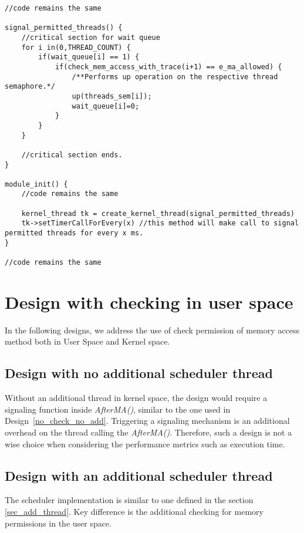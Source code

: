 \begin{lstlisting}[title=Kernel Space - General module definitions, style=customc]
//code remains the same

signal_permitted_threads() {
	//critical section for wait queue
	for i in(0,THREAD_COUNT) {
		if(wait_queue[i] == 1) {
			if(check_mem_access_with_trace(i+1) == e_ma_allowed) {
				/**Performs up operation on the respective thread semaphore.*/
				up(threads_sem[i]);
				wait_queue[i]=0;			
			}		
		}
	}	
	
	//critical section ends.
}

module_init() {
	//code remains the same
	
	kernel_thread tk = create_kernel_thread(signal_permitted_threads)
	tk->setTimerCallForEvery(x) //this method will make call to signal permitted threads for every x ms.
}

//code remains the same
\end{lstlisting}


\section{Design with checking in user space}

In the following designs, we address the use of check permission of memory access method both in User Space and Kernel space.

\subsection{Design with no additional scheduler thread}

Without an additional thread in kernel space, the design would require a signaling function inside \emph{AfterMA()}, similar to the one used in Design~\ref{no_check_no_add}. 
Triggering a signaling mechanism is an additional overhead on the thread calling the \emph{AfterMA()}. 
Therefore, such a design is not a wise choice when considering the performance metrics such as execution time.
 
\subsection{Design with an additional scheduler thread}

The scheduler implementation is similar to one defined in the section \ref{sec_add_thread}. 
Key difference is the additional checking for memory permissions in the user space. 

